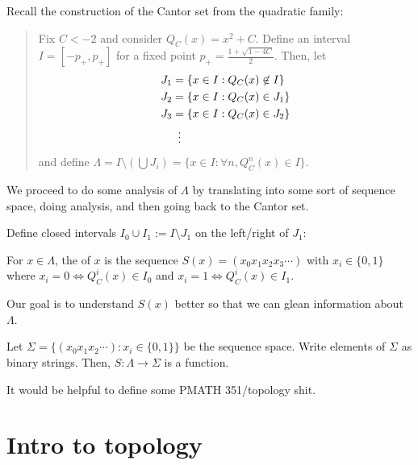 \documentclass[class=pmath370,tikz,notes]{agony}
\begin{document}
Recall the construction of the Cantor set from the quadratic family:
\begin{quote}
  Fix $C < -2$ and consider $Q_C(x) = x^2 + C$.
  Define an interval $I = [-p_+,p_+]$
  for a fixed point $p_+ = \frac{1+\sqrt{1-4C}}{2}$.
  Then, let
  \begin{align*}
    J_1 & = \{x \in I : Q_C(x) \not\in I\} \\
    J_2 & = \{x \in I : Q_C(x) \in J_1\}   \\
    J_3 & = \{x \in I : Q_C(x) \in J_2\}   \\
        & \vdotswithin{=}
  \end{align*}
  and define $\Lambda = I \setminus (\bigcup J_i) = \{x \in I : \forall n, Q^n_C(x) \in I\}$.
\end{quote}
We proceed to do some analysis of $\Lambda$ by translating into
some sort of sequence space, doing analysis, and then going back to the Cantor set.

\begin{notation}
  Define closed intervals $I_0 \cup I_1 := I \setminus J_1$ on the left/right of $J_1$:
  \begin{center}
  \end{center}
\end{notation}

\begin{defn}
  For $x \in \Lambda$, the  of $x$ is
  the sequence $S(x) = (x_0x_1x_2x_3\cdots)$ with $x_i \in \{0,1\}$
  where $x_i = 0 \iff Q_C^i(x) \in I_0$
  and $x_i = 1 \iff Q_C^i(x) \in I_1$.
\end{defn}

Our goal is to understand $S(x)$ better so that we can glean information about $\Lambda$.

\begin{notation}
  Let $\Sigma = \{(x_0x_1x_2\cdots) : x_i \in \{0,1\}\}$ be the sequence space.
  Write elements of $\Sigma$ as binary strings.
  Then, $S : \Lambda \to \Sigma$ is a function.
\end{notation}

It would be helpful to define some PMATH 351/topology shit.

\section{Intro to topology}
\end{document}
